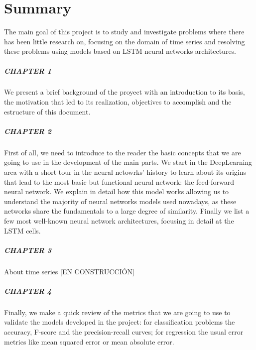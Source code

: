 %

\chapter*{Summary}\label{ch:summary}

The main goal of this project is to study and investigate problems where there has been little research on, focusing on the domain of time series and resolving these problems using models based on LSTM neural networks architectures.

\paragraph{CHAPTER 1} We present a brief background of the proyect with an introduction to its basis, the motivation that led to its realization, objectives to accomplish and the estructure of this document.

\paragraph{CHAPTER 2} First of all, we need to introduce to the reader the basic concepts that we are going to use in the development of the main parts. We start in the DeepLearning area with a short tour in the neural netowrks' history to learn about its origins that lead to the most basic but functional neural network: the feed-forward neural network. We explain in detail how this model works allowing us to understand the majority of neural networks models used nowadays, as these networks share the fundamentals to a large degree of similarity. Finally we list a few most well-known neural network architectures, focusing in detail at the LSTM cells.

\paragraph{CHAPTER 3} About time series [EN CONSTRUCCIÓN]

\paragraph{CHAPTER 4} Finally, we make a quick review of the metrics that we are going to use to validate the models developed in the project: for classification problems the accuracy, F-score and the precision-recall curves; for regression the usual error metrics like mean squared error or mean absolute error.

